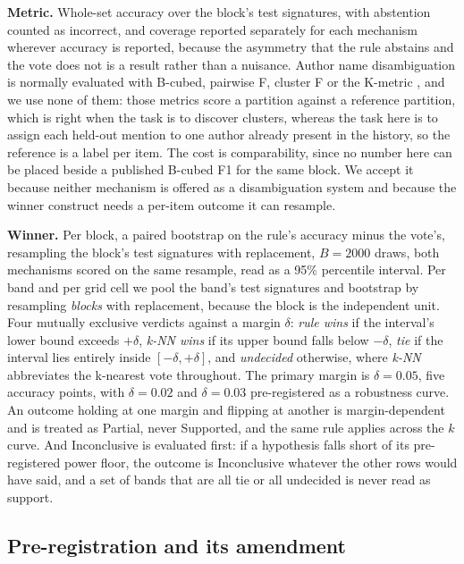 \documentclass[11pt]{article}
\begin{document}
\textbf{Metric.} Whole-set accuracy over the block's test signatures, with
abstention counted as incorrect, and coverage reported separately for each
mechanism wherever accuracy is reported, because the asymmetry that the rule
abstains and the vote does not is a result rather than a nuisance. Author name
disambiguation is normally evaluated with B-cubed, pairwise F, cluster F or
the K-metric \citep{amigo2009, kim2019}, and we use none of them: those
metrics score a partition against a reference partition, which is right when
the task is to discover clusters, whereas the task here is to assign each
held-out mention to one author already present in the history, so the
reference is a label per item. The cost is comparability, since no number here
can be placed beside a published B-cubed F1 for the same block. We accept it
because neither mechanism is offered as a disambiguation system and because
the winner construct needs a per-item outcome it can resample.

\textbf{Winner.} Per block, a paired bootstrap on the rule's accuracy minus
the vote's, resampling the block's test signatures with replacement,
$B = 2000$ draws, both mechanisms scored on the same resample, read as a 95\%
percentile interval. Per band and per grid cell we pool the band's test
signatures and bootstrap by resampling \emph{blocks} with replacement, because
the block is the independent unit. Four mutually exclusive verdicts against a
margin $\delta$: \emph{rule wins} if the interval's lower bound exceeds
$+\delta$, \emph{k-NN wins} if its upper bound falls below $-\delta$,
\emph{tie} if the interval lies entirely inside $[-\delta, +\delta]$, and
\emph{undecided} otherwise, where \emph{k-NN} abbreviates the k-nearest vote
throughout. The primary margin is $\delta = 0.05$, five accuracy points, with
$\delta = 0.02$ and $\delta = 0.03$ pre-registered as a robustness curve. An
outcome holding at one margin and flipping at another is margin-dependent and
is treated as Partial, never Supported, and the same rule applies across the
$k$ curve. And Inconclusive is evaluated first: if a hypothesis falls short
of its pre-registered power floor, the outcome is Inconclusive whatever the
other rows would have said, and a set of bands that are all tie or all
undecided is never read as support.

\subsection{Pre-registration and its amendment}
\label{sec:prereg-integrity}
\end{document}
